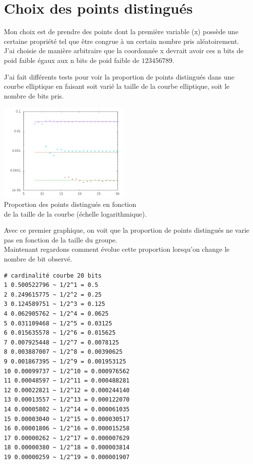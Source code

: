 \documentclass[a4paper,10pt]{report}
\begin{document}
\section{Choix des points distingués}

Mon choix est de prendre des points dont la première variable (x) possède une certaine propriété tel que être congrue à un
 certain nombre pris aléatoirement. J'ai choisie de manière arbitraire que la coordonnée x devrait avoir ces n bits de poid 
faible égaux aux n bits de poid faible de $123456789$.

J'ai fait différents tests pour voir la proportion de points distingués dans une courbe elliptique en faisant soit varié la 
taille de la courbe elliptique, soit le nombre de bits pris.

\begin{center}
  \includegraphics[width = 6.5cm]{courbe_pourcentage_different_point_distingue.png}\\
Proportion des points distingués en fonction \\
 de la taille de la courbe (échelle logarithmique).
\end{center}

 Avec ce premier graphique, on voit que la proportion de points distingués ne varie pas en fonction de la taille du groupe.\\

Maintenant regardons comment évolue cette proportion lorsqu'on change le nombre de bit observé.

\begin{verbatim}
# cardinalité courbe 20 bits
1 0.500522796 ~ 1/2^1 = 0.5
2 0.249615775 ~ 1/2^2 = 0.25
3 0.124589751 ~ 1/2^3 = 0.125
4 0.062905762 ~ 1/2^4 = 0.0625
5 0.031109468 ~ 1/2^5 = 0.03125
6 0.015635578 ~ 1/2^6 = 0.015625
7 0.007925448 ~ 1/2^7 = 0.0078125
8 0.003887007 ~ 1/2^8 = 0.00390625
9 0.001867395 ~ 1/2^9 = 0.001953125
10 0.00099737 ~ 1/2^10 = 0.000976562
11 0.00048597 ~ 1/2^11 = 0.000488281
12 0.00022821 ~ 1/2^12 = 0.000244140
13 0.00013557 ~ 1/2^13 = 0.000122070
14 0.00005802 ~ 1/2^14 = 0.000061035
15 0.00003040 ~ 1/2^15 = 0.000030517
16 0.00001806 ~ 1/2^16 = 0.000015258
17 0.00000262 ~ 1/2^17 = 0.000007629
18 0.00000380 ~ 1/2^18 = 0.000003814
19 0.00000259 ~ 1/2^19 = 0.000001907
\end{verbatim}
\end{document}
